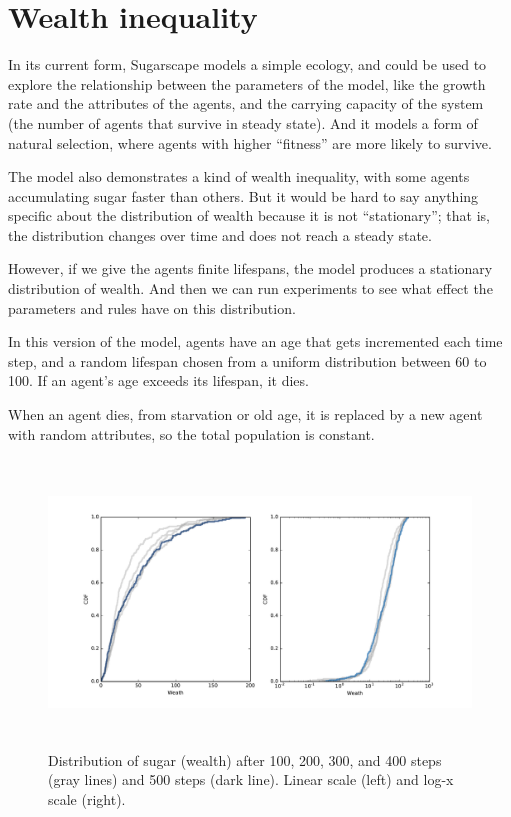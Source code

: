 \documentclass[12pt]{book}
\theoremstyle{exercise}
\begin{document}
\section{Wealth inequality}

In its current form, Sugarscape models a simple ecology, and could
be used to explore the relationship between the parameters of the
model, like the growth rate and the attributes of the agents, and
the carrying capacity of the system (the number of agents that
survive in steady state).  And it models a form of natural selection,
where agents with higher ``fitness'' are more likely to survive.

The model also demonstrates a kind of wealth inequality, with some
agents accumulating sugar faster than others.  But it would be hard
to say anything specific about the distribution of wealth because it
is not ``stationary''; that is, the distribution changes over time and
does not reach a steady state.

However, if we give the agents finite lifespans, the model produces
a stationary distribution of wealth.  And then we can run experiments to
see what effect the parameters and rules have on this distribution.

In this version of the model, agents have an age that gets incremented
each time step, and a random lifespan chosen from a uniform distribution between 60 to 100.  If an agent's age exceeds its lifespan, it dies.

When an agent dies, from starvation or old age, it is replaced by
a new agent with random attributes, so the total population is
constant.

\begin{figure}
\centerline{\includegraphics[height=3in]{figs/chap09-4.pdf}}
\caption{Distribution of sugar (wealth) after 100, 200, 300, and
400 steps (gray lines) and 500 steps (dark line).  Linear scale (left)
and log-x scale (right). }
\label{chap09-4}
\end{figure}
\end{document}
